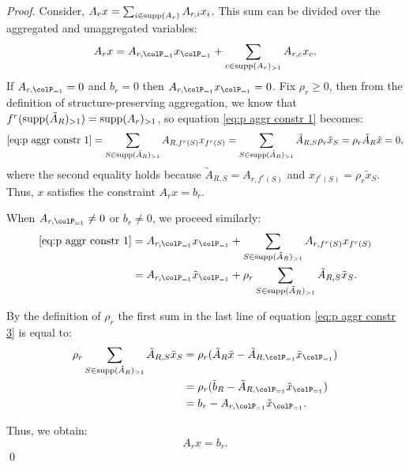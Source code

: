 \begin{proof}

 Consider, \(A_r x = \sum_{i \in \operatorname{supp}(A_r)} A_{r,i} x_i\). 
  This sum can be divided over the aggregated and unaggregated variables:
  \begin{equation}
    \label{eq:p aggr constr 1}
    A_r x =  A_{r, \colP_{=1}} x_{\colP_{=1}} + \sum_{c \in \supp(A_r)_{>1}}  A_{r, c} x_{c}  .
  \end{equation}
  If \(A_{r, \colP_{=1}} = 0\) and \(b_r = 0\) then \( A_{r, \colP_{=1}} x_{\colP_{=1}} = 0\). Fix \(\rho_r \geq 0\), then
  from the definition of structure-preserving aggregation, we know that \(f^r(\operatorname{supp}(\tilde{A}_R)_{>1}) = \operatorname{supp}(A_r)_{>1}\), so equation \eqref{eq:p aggr constr 1} becomes:
  \begin{equation}
    \label{eq:p aggr constr 2}
    \eqref{eq:p aggr constr 1} = \sum_{S \in \operatorname{supp}(\tilde{A}_R)_{>1}} A_{R, f^r(S)} x_{f^r(S)} =  \sum_{S \in \operatorname{supp}(\tilde{A}_R)_{>1}} \tilde{A}_{R, S} \rho_r \tilde{x}_S  = \rho_r \tilde{A}_R \tilde{x} = 0,
  \end{equation}
  where the second equality holds because \(\tilde{A}_{R, S} = A_{r, f^r(S)}\) and \(x_{f^r(S)} = \rho_r \tilde{x}_S\). Thus, \(x\) satisfies the constraint \(A_r x = b_r\).
  
  When \(A_{r, \colP_{=1}} \neq 0\) or \(b_r \neq 0\), we proceed similarly:
  \begin{align}
  \label{eq:p aggr constr 3}
 \eqref{eq:p aggr constr 1} &=A_{r, \colP_{=1}} x_{\colP_{=1}} + \sum_{S \in \supp(\tilde{A}_R)_{>1}} A_{r, f^r(S)} x_{f^r(S)}  \\
  &=  A_{r, \colP_{=1}} \tilde{x}_{\colP_{=1}} + \rho_r \sum_{S \in \supp(\tilde{A}_R)_{>1}} \tilde{A}_{R, S}  \tilde{x}_S.
  \end{align}
  
  By the definition of \(\rho_r\) the first sum in the last line of equation \eqref{eq:p aggr constr 3} is equal to:
  \begin{align*}
  \rho_r \sum_{S \in \supp(\tilde{A}_R)_{>1}} \tilde{A}_{R, S} \tilde{x}_S 
  &= \rho_r (\tilde{A}_R \tilde{x} - \tilde{A}_{R, \colP_{=1}} \tilde{x}_{\colP_{=1}}) \\
  &= \rho_r (\tilde{b}_R - \tilde{A}_{R, \colP_{=1}} \tilde{x}_{\colP_{=1}}) \\
  &= b_r - A_{r, \colP_{=1}} \tilde{x}_{\colP_{=1}}.
  \end{align*}
  
  Thus, we obtain:
  \[
  A_r x = b_r.
  \]
  \qed
  \end{proof}


